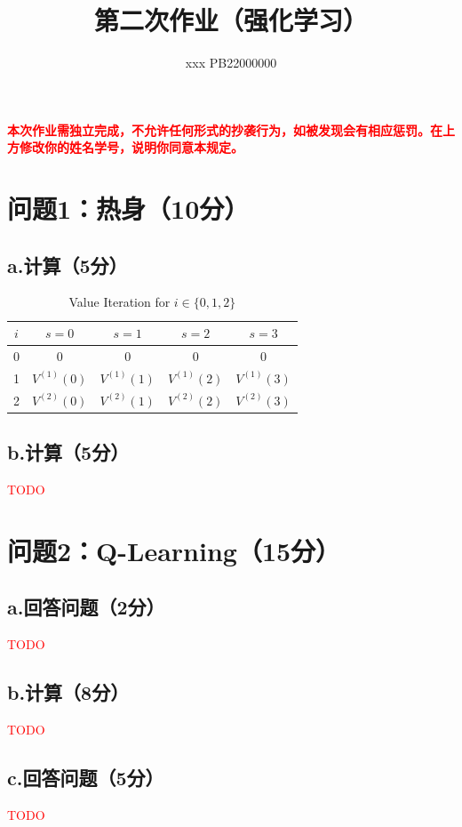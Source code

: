 \documentclass{article}
\title{\bfseries 第二次作业（强化学习）}
\author{xxx  \quad  PB22000000}
\begin{document}
\maketitle
\textcolor{red}{\textbf{本次作业需独立完成，不允许任何形式的抄袭行为，如被发现会有相应惩罚。在上方修改你的姓名学号，说明你同意本规定。}}

\section*{问题1：热身（10分）}
\subsection*{a.计算（5分）}
\begin{table}[h]
    \centering
    \begin{tabular}{|c|c|c|c|c|}
    \hline
    $i$ & $s=0$ & $s=1$ & $s=2$ & $s=3$ \\
    \hline
    0 & 0 & 0 & 0 & 0 \\
    1 & $V^{(1)}(0)$ & $V^{(1)}(1)$ & $V^{(1)}(2)$ & $V^{(1)}(3)$ \\
    2 & $V^{(2)}(0)$ & $V^{(2)}(1)$ & $V^{(2)}(2)$ & $V^{(2)}(3)$ \\
    \hline
    \end{tabular}
    \caption{Value Iteration for $i \in \{0, 1, 2\}$}
    \end{table}

\subsection*{b.计算（5分）}
\textcolor{red}{TODO}




\section*{问题2：Q-Learning（15分）}
\subsection*{a.回答问题（2分）}
\textcolor{red}{TODO} 

\subsection*{b.计算（8分）}
\textcolor{red}{TODO}

\subsection*{c.回答问题（5分）}
\textcolor{red}{TODO}
\end{document}
